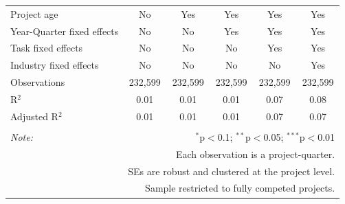\documentclass[
]{article}
\begin{document}
\begin{table}[H]
\begin{tabular}{@{\extracolsep{-2pt}}lccccc}
Project age & No & Yes & Yes & Yes & Yes \\ 
Year-Quarter fixed effects & No & No & Yes & Yes & Yes \\ 
Task fixed effects & No & No & No & Yes & Yes \\ 
Industry fixed effects & No & No & No & No & Yes \\ 
Observations & 232,599 & 232,599 & 232,599 & 232,599 & 232,599 \\ 
R$^{2}$ & 0.01 & 0.01 & 0.01 & 0.07 & 0.08 \\ 
Adjusted R$^{2}$ & 0.01 & 0.01 & 0.01 & 0.07 & 0.07 \\ 
\hline 
\hline \\[-1.8ex] 
\textit{Note:}  & \multicolumn{5}{r}{$^{*}$p$<$0.1; $^{**}$p$<$0.05; $^{***}$p$<$0.01} \\ 
 & \multicolumn{5}{r}{Each observation is a project-quarter.} \\ 
 & \multicolumn{5}{r}{SEs are robust and clustered at the project level.} \\ 
 & \multicolumn{5}{r}{Sample restricted to fully competed projects.} \\ 
\end{tabular} 
\end{table}
\end{document}
